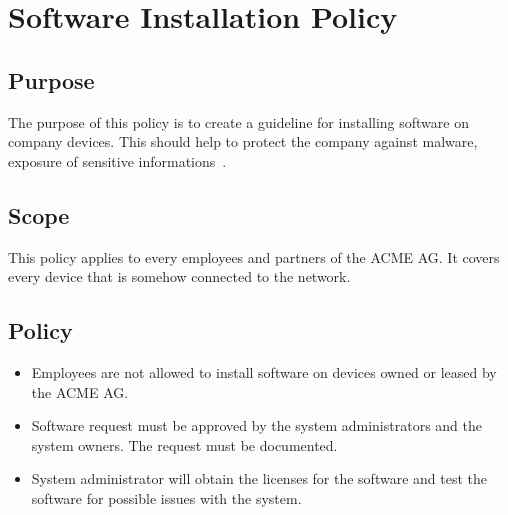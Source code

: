 \chapter{Software Installation Policy}
\section{Purpose}
The purpose of this policy is to create a guideline for installing software on company devices. This should help to protect the company against malware, exposure of sensitive informations~\cite{Sans}. 
\section{Scope}
This policy applies to every employees and partners of the ACME AG. It covers every device that is somehow connected to the network.
\section{Policy}
\begin{itemize}
\item Employees are not allowed to install software on devices owned or leased by the ACME AG.
\item Software request must be approved by the system administrators and the system owners. The request must be documented.
\item System administrator will obtain the licenses for the software and test the software for possible issues with the system.
\end{itemize}



